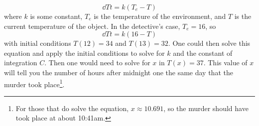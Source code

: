\begin{enumerate}[label=\arabic*.]
\begin{equation*}
			\dd{T}{t} = k\left(T_e - T\right)
		\end{equation*}
		where $k$ is some constant, $T_e$ is the temperature of the environment, and $T$ is the current temperature of the object.
		In the detective's case, $T_e = 16$, so
		\begin{equation*}
			\dd{T}{t} = k(16-T)
		\end{equation*}
		with initial conditions $T(12) = 34$ and $T(13) = 32$.
		One could then solve this equation and apply the initial conditions to solve for $k$ and the constant of integration $C$.
		Then one would need to solve for $x$ in $T(x) = 37$.
		This value of $x$ will tell you the number of hours after midnight one the same day that the murder took place\footnote{For those that do solve the equation, $x \approx 10.691$, so the murder should have took place at about 10:41am.}.
\end{enumerate}